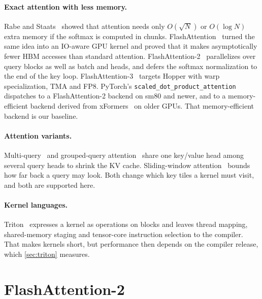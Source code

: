 \documentclass[10pt,twocolumn,letterpaper]{article}
\begin{document}
\paragraph{Exact attention with less memory.}
Rabe and Staats~\cite{rabe2021selfattention} showed that attention needs only
$O(\sqrt{N})$ or $O(\log N)$ extra memory if the softmax is computed in
chunks. FlashAttention~\cite{dao2022flashattention} turned the same idea into
an IO-aware GPU kernel and proved that it makes asymptotically fewer HBM
accesses than standard attention. FlashAttention-2~\cite{dao2024flashattention2}
parallelizes over query blocks as well as batch and heads, and defers the
softmax normalization to the end of the key loop. FlashAttention-3~\cite{shah2024flashattention3}
targets Hopper with warp specialization, TMA and FP8. PyTorch's
\texttt{scaled\_dot\_product\_attention}~\cite{paszke2019pytorch} dispatches to
a FlashAttention-2 backend on sm80 and newer, and to a memory-efficient
backend derived from xFormers~\cite{lefaudeux2022xformers} on older GPUs. That
memory-efficient backend is our baseline.

\paragraph{Attention variants.}
Multi-query~\cite{shazeer2019fast} and grouped-query
attention~\cite{ainslie2023gqa} share one key/value head among several query
heads to shrink the KV cache. Sliding-window attention~\cite{beltagy2020longformer,
jiang2023mistral} bounds how far back a query may look. Both change which
key tiles a kernel must visit, and both are supported here.

\paragraph{Kernel languages.}
Triton~\cite{tillet2019triton} expresses a kernel as operations on blocks and
leaves thread mapping, shared-memory staging and tensor-core instruction
selection to the compiler. That makes kernels short, but performance then
depends on the compiler release, which \cref{sec:triton} measures.

\section{FlashAttention-2}
\label{sec:method}
\end{document}
